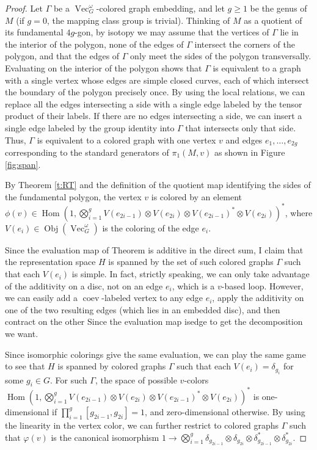 \documentclass{amsart}
\DeclareMathOperator{\Vect}{Vec}
\DeclareMathOperator{\Hom}{Hom}
\DeclareMathOperator{\Obj}{Obj}
\DeclareMathOperator{\coev}{coev}
\newcommand{\one}{1}
\newcommand{\ph}{\varphi}
\begin{document}
\begin{proof}
Let $\Gamma$ be a $\Vect_G^\omega$-colored graph embedding, and let $g \ge 1$ be the genus of $M$ (if $g = 0$, the mapping class group is trivial). Thinking of $M$ as a quotient of its fundamental $4g$-gon, by isotopy we may assume that the vertices of $\Gamma$ lie in the interior of the polygon, none of the edges of $\Gamma$ intersect the corners of the polygon, and that the edges of $\Gamma$ only meet the sides of the polygon transversally.  Evaluating on the interior of the polygon shows that $\Gamma$ is equivalent to a graph with a single vertex whose edges are simple closed curves, each of which intersect the boundary of the polygon precisely once.  By using the local relations, we can replace all the edges intersecting a side with a single edge labeled by the tensor product of their labels.  If there are no edges intersecting a side, we can insert a single edge labeled by the group identity into $\Gamma$ that intersects only that side.  Thus, $\Gamma$ is equivalent to a colored graph with one vertex $v$ and edges $e_1, \ldots, e_{2g}$ corresponding to the standard generators of $\pi_1(M,v)$ as shown in Figure \ref{fig:span}.

By Theorem \ref{t:RT} and the definition of the quotient map identifying the sides of the fundamental polygon, the vertex $v$ is colored by an element $\phi(v) \in \Hom (\one, \bigotimes_{i=1}^g V(e_{2i-1}) \otimes V(e_{2i})  \otimes V(e_{2i-1})^* \otimes V(e_{2i}))^*$, where $V(e_i) \in \Obj(\Vect_G^\omega)$ is the coloring of the edge $e_i$.   

Since the evaluation map of Theorem \label{t:RT} is additive in the direct sum, I claim that the representation space $H$ is spanned by the set of such colored graphs $\Gamma$ such that each $V(e_i)$ is simple.   In fact, strictly speaking, we can only take advantage of the additivity on a disc, not on an edge $e_i$, which is a $v$-based loop. However, we can easily add a $\coev$-labeled vertex to any edge $e_i$, apply the additivity on one of the two resulting edges (which lies in an embedded disc), and then contract on the other Since the evaluation map isedge to get the decomposition we want.

Since isomorphic colorings give the same evaluation, we can play the same game to see that $H$ is spanned by colored graphs $\Gamma$ such that
each $V(e_i) = \delta_{g_i}$ for some $g_i \in G$.  For such $\Gamma$,  the space of possible $v$-colors $\Hom (\one, \bigotimes_{i=1}^g V(e_{2i-1}) \otimes V(e_{2i})  \otimes V(e_{2i-1})^* \otimes V(e_{2i}))^*$ is one-dimensional if $\prod_{i=1}^g [g_{2i-1}, g_{2i}] = 1$, and zero-dimensional otherwise.
By using the linearity in the vertex color, we can further restrict to colored graphs $\Gamma$ such that $\ph(v)$ is the canonical isomorphism $\one \to \bigotimes_{i=1}^g \delta_{g_{2i-1}} \otimes \delta_{g_{2i}} \otimes \delta_{g_{2i-1}}^* \otimes \delta_{g_{2i}}^*$. 


\end{proof}
\end{document}
